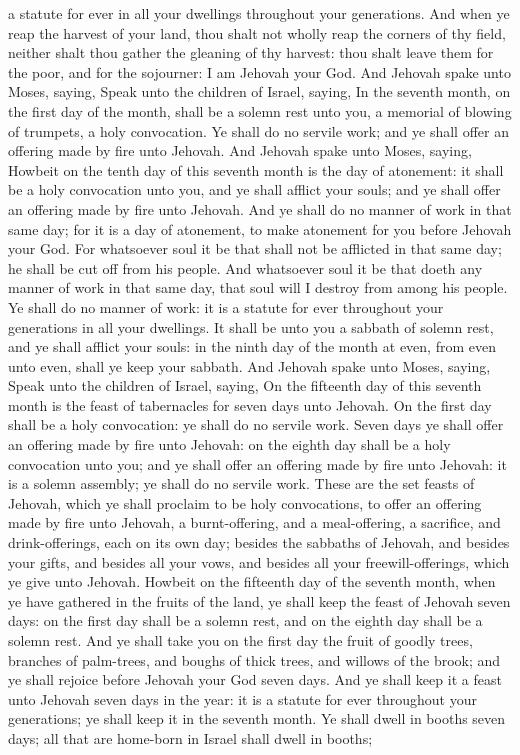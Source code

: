 a statute for ever in all your dwellings throughout your generations.  And when ye reap the harvest of your land, thou shalt not wholly reap the corners of thy field, neither shalt thou gather the gleaning of thy harvest: thou shalt leave them for the poor, and for the sojourner: I am Jehovah your God.  And Jehovah spake unto Moses, saying, Speak unto the children of Israel, saying, In the seventh month, on the first day of the month, shall be a solemn rest unto you, a memorial of blowing of trumpets, a holy convocation. Ye shall do no servile work; and ye shall offer an offering made by fire unto Jehovah.  And Jehovah spake unto Moses, saying, Howbeit on the tenth day of this seventh month is the day of atonement: it shall be a holy convocation unto you, and ye shall afflict your souls; and ye shall offer an offering made by fire unto Jehovah. And ye shall do no manner of work in that same day; for it is a day of atonement, to make atonement for you before Jehovah your God. For whatsoever soul it be that shall not be afflicted in that same day; he shall be cut off from his people. And whatsoever soul it be that doeth any manner of work in that same day, that soul will I destroy from among his people. Ye shall do no manner of work: it is a statute for ever throughout your generations in all your dwellings. It shall be unto you a sabbath of solemn rest, and ye shall afflict your souls: in the ninth day of the month at even, from even unto even, shall ye keep your sabbath.  And Jehovah spake unto Moses, saying, Speak unto the children of Israel, saying, On the fifteenth day of this seventh month is the feast of tabernacles for seven days unto Jehovah. On the first day shall be a holy convocation: ye shall do no servile work. Seven days ye shall offer an offering made by fire unto Jehovah: on the eighth day shall be a holy convocation unto you; and ye shall offer an offering made by fire unto Jehovah: it is a solemn assembly; ye shall do no servile work.  These are the set feasts of Jehovah, which ye shall proclaim to be holy convocations, to offer an offering made by fire unto Jehovah, a burnt-offering, and a meal-offering, a sacrifice, and drink-offerings, each on its own day; besides the sabbaths of Jehovah, and besides your gifts, and besides all your vows, and besides all your freewill-offerings, which ye give unto Jehovah.  Howbeit on the fifteenth day of the seventh month, when ye have gathered in the fruits of the land, ye shall keep the feast of Jehovah seven days: on the first day shall be a solemn rest, and on the eighth day shall be a solemn rest. And ye shall take you on the first day the fruit of goodly trees, branches of palm-trees, and boughs of thick trees, and willows of the brook; and ye shall rejoice before Jehovah your God seven days. And ye shall keep it a feast unto Jehovah seven days in the year: it is a statute for ever throughout your generations; ye shall keep it in the seventh month. Ye shall dwell in booths seven days; all that are home-born in Israel shall dwell in booths; 